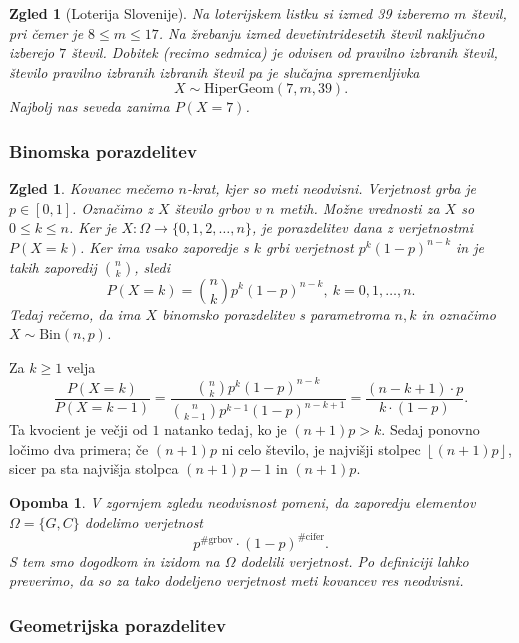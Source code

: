 \documentclass[10pt, a4paper]{article}
\newtheorem*{opomba}{Opomba}
\newtheorem{zgled}[izr]{Zgled}
\begin{document}
\begin{zgled}[Loterija Slovenije]
  Na loterijskem listku si izmed 39 izberemo $m$ števil, pri čemer je $8 \leq m \leq 17$.
  Na žrebanju izmed devetintridesetih števil naključno izberejo $7$ števil.
  Dobitek (recimo sedmica) je odvisen od pravilno izbranih števil,
  število pravilno izbranih izbranih števil pa je slučajna spremenljivka $$X \sim \mathrm{HiperGeom} (7, m, 39).$$
  Najbolj nas seveda zanima $P(X = 7)$.
\end{zgled}

\subsubsection*{Binomska porazdelitev}

\begin{zgled}
  Kovanec mečemo $n$-krat, kjer so meti neodvisni.
  Verjetnost grba je $p \in [0, 1]$.
  Označimo z $X$ število grbov v $n$ metih. Možne vrednosti za $X$ so $0 \leq k \leq n$.
  Ker je $X: \Omega \to \{0, 1, 2, \dots, n\}$, je porazdelitev dana z verjetnostmi $P(X = k)$.
  Ker ima vsako zaporedje s $k$ grbi verjetnost $p^k (1 - p)^{n - k}$ in je takih zaporedij $\binom{n}{k}$, sledi 
  $$P(X = k) = \binom{n}{k} p^k (1 - p)^{n - k},\ k = 0, 1, \dots, n.$$
  Tedaj rečemo, da ima $X$ binomsko porazdelitev s parametroma $n, k$ in označimo $X \sim \mathrm{Bin} (n, p)$.
\end{zgled}
  
Za $k \geq 1$ velja 
$$\frac{P(X = k)}{P(X = k - 1)} = \frac{\binom{n}{k} p^k (1 - p)^{n - k}}{\binom{n}{k - 1} p^{k - 1} (1 - p)^{n - k + 1}} = \frac{(n - k + 1) \cdot p}{k \cdot (1 - p)}.$$
Ta kvocient je večji od $1$ natanko tedaj, ko je $(n + 1) p > k$.
Sedaj ponovno ločimo dva primera; če $(n + 1)p$ ni celo število, je najvišji stolpec $\left\lfloor (n + 1) p\right\rfloor$,
sicer pa sta najvišja stolpca $(n + 1)p - 1$ in $(n + 1)p$.

\begin{opomba}
  V zgornjem zgledu neodvisnost pomeni, da zaporedju elementov $\Omega = \{G, C\}$
  dodelimo verjetnost $$p^{\mathrm{\# grbov}} \cdot (1 - p)^{\mathrm{\# cifer}}.$$
  S tem smo dogodkom in izidom na $\Omega$ dodelili verjetnost.
  Po definiciji lahko preverimo, da so za tako dodeljeno verjetnost meti kovancev res neodvisni.
\end{opomba}

\subsubsection*{Geometrijska porazdelitev}
\end{document}
